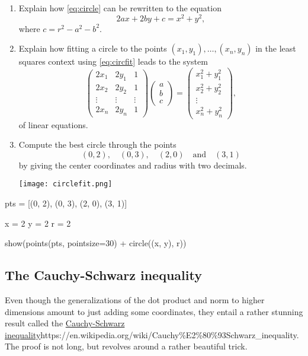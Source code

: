 \documentclass{article}
\begin{document}
\begin{enumerate}
\item
  Explain how \eqref{eq:circle} can be rewritten to the equation
\begin{equation}\label{eq:circfit}
2 a x + 2 b y + c = x^2 + y^2,
\end{equation}
where $c = r^2 - a^2 - b^2$.

\item
  Explain how fitting a circle to the points $(x_1, y_1), \dots, (x_n, y_n)$
  in the least squares context using \eqref{eq:circfit} leads to the system
$$
\begin{pmatrix}
2 x_1 & 2 y_1 & 1\\
2 x_2 & 2 y_2 & 1\\
\vdots &\vdots &\vdots\\
2 x_n & 2 y_n & 1
\end{pmatrix}
\begin{pmatrix}
a \\
b \\
c
\end{pmatrix}
=
\begin{pmatrix}
x_1^2 + y_1^2\\
x_2^2 + y_2^2\\
\vdots \\
x_n^2 + y_n^2
\end{pmatrix},
$$
of linear equations.

\item

  Compute the best circle through the points
$$
(0, 2),\quad (0, 3),\quad  (2,0)\quad\text{and}\quad (3, 1)
$$ 
by giving the center coordinates and radius with two decimals.

\texttt{[image: circlefit.png]}

\end{enumerate}

\begin{sage}
pts = [(0, 2), (0, 3), (2, 0), (3, 1)]

x = 2
y = 2
r = 2

show(points(pts, pointsize=30) + circle((x, y), r))
\end{sage}

\endshex

\subsection{The Cauchy-Schwarz inequality}

Even though the generalizations of the dot product and norm to higher
dimensions amount to just adding some coordinates, they entail
a rather stunning result called the \url{Cauchy-Schwarz inequality}{https://en.wikipedia.org/wiki/Cauchy\%E2\%80\%93Schwarz_inequality}. The
proof is not long, but revolves around a rather beautiful trick.
\end{document}
